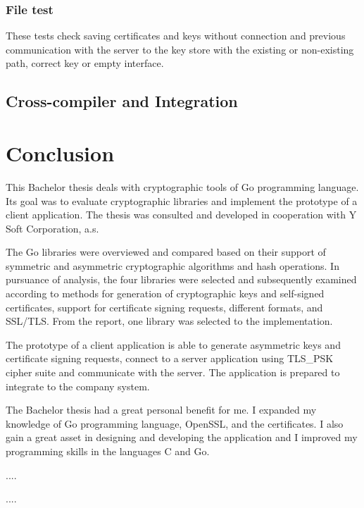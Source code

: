 \documentclass[
  digital, %
  notable,   %
  lof,     %
  lot,     %
]{fithesis3}
\begin{document}
\subsection{File test}
These tests check saving certificates and keys without connection and previous communication with 
the server to the key store with the existing or non-existing path, correct key or empty 
interface. 

\section{Cross-compiler and Integration}




\chapter{Conclusion}
This Bachelor thesis deals with cryptographic tools of Go programming language. Its goal was to 
evaluate cryptographic libraries and implement the prototype of a client application. The thesis 
was consulted and developed in cooperation with Y Soft Corporation, a.s.

The Go libraries were overviewed and compared based on their support of symmetric and asymmetric 
cryptographic algorithms and hash operations. In pursuance of analysis, the four libraries were 
selected and subsequently examined according to methods for generation of cryptographic keys and 
self-signed certificates, support for certificate signing requests, different formats, and 
SSL/TLS.  From the report, one library was selected to the implementation.

The prototype of a client application is able to generate asymmetric keys and certificate signing 
requests, connect to a server application using TLS\_PSK cipher suite and communicate with the 
server. The application is prepared to integrate to the company system.

The Bachelor thesis had a great personal benefit for me. I expanded my knowledge of Go programming 
language, OpenSSL, and the certificates. I also gain a great asset in designing and developing the 
application and I improved my programming skills in the languages C and Go. 

....

....

\printbibliography
\end{document}
